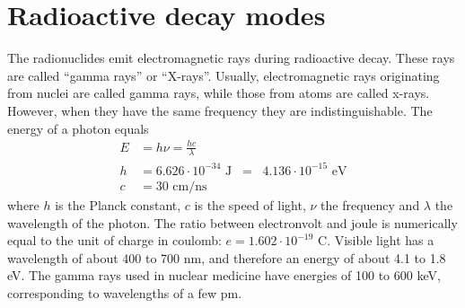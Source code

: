 \documentclass[11pt,oneside]{book}
\begin{document}
\section{Radioactive decay modes}
The radionuclides emit electromagnetic rays during radioactive decay. These
rays are called ``gamma rays'' or ``X-rays''.  Usually, electromagnetic rays
originating from nuclei are called gamma rays, while those from atoms are
called x-rays. However, when they have the same frequency they are
indistinguishable. The energy of a photon equals
\begin{align}
   E &= h\nu = \frac{hc}{\lambda}\\
   h &= 6.626 \cdot 10^{-34} \mbox{ J} 
   \;\;=\;\; 4.136\cdot 10^{-15} \mbox{ eV}\\
   c &= 30 \mbox{ cm/ns}
\end{align}
where $h$ is the Planck constant, $c$ is the speed of light, $\nu$ the
frequency and $\lambda$ the wavelength of the photon. The ratio
between electronvolt and joule is numerically equal to the unit of
charge in coulomb: $e = 1.602\cdot 10^{-19}$ C. Visible light has a
wavelength of about 400 to 700 nm, and therefore an energy of about
4.1 to 1.8 eV. The gamma rays used in nuclear medicine have energies
of 100 to 600 keV, corresponding to wavelengths of a few pm.
\end{document}
